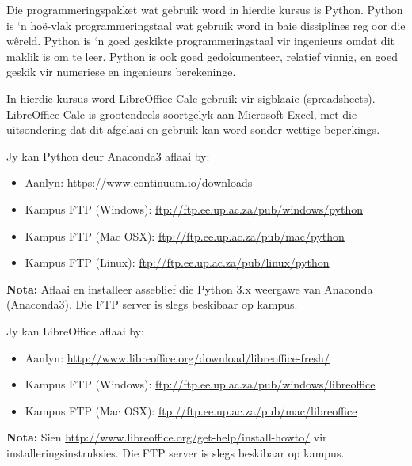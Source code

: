         Die programmeringspakket wat gebruik word in hierdie kursus is Python.
        Python is `n ho\"{e}-vlak programmeringstaal wat gebruik word in baie
        dissiplines reg oor die w\^{e}reld. Python is `n goed geskikte
        programmeringstaal vir ingenieurs omdat dit maklik is om te leer.
        Python is ook goed gedokumenteer, relatief vinnig, en goed geskik vir
        numeriese en ingenieurs berekeninge.

        In hierdie kursus word LibreOffice Calc gebruik vir sigblaaie
        (spreadsheets). LibreOffice Calc is grootendeels soortgelyk aan
        Microsoft Excel, met die uitsondering dat dit afgelaai en gebruik kan
        word sonder wettige beperkings.

        \noindent
        Jy kan Python deur Anaconda3 aflaai by:
        \begin{itemize}
            \item Aanlyn: \url{https://www.continuum.io/downloads}
            \item Kampus FTP (Windows): \url{ftp://ftp.ee.up.ac.za/pub/windows/python}
            \item Kampus FTP (Mac OSX): \url{ftp://ftp.ee.up.ac.za/pub/mac/python}
            \item Kampus FTP (Linux): \url{ftp://ftp.ee.up.ac.za/pub/linux/python}
        \end{itemize}
        \textbf{Nota:} Aflaai en installeer asseblief die Python 3.x weergawe
        van Anaconda (Anaconda3). Die FTP server is slegs beskibaar op kampus.

        \noindent
        Jy kan LibreOffice aflaai by:
        \begin{itemize}
            \item Aanlyn: \url{http://www.libreoffice.org/download/libreoffice-fresh/}
            \item Kampus FTP (Windows): \url{ftp://ftp.ee.up.ac.za/pub/windows/libreoffice}
            \item Kampus FTP (Mac OSX): \url{ftp://ftp.ee.up.ac.za/pub/mac/libreoffice}
        \end{itemize}
        \textbf{Nota:} Sien
        \url{http://www.libreoffice.org/get-help/install-howto/} vir
        installeringsinstruksies. Die FTP server is slegs beskibaar op kampus.
